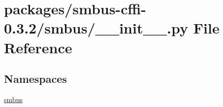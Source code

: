 \hypertarget{packages_2smbus-cffi-0_83_82_2smbus_2____init_____8py}{}\section{packages/smbus-\/cffi-\/0.3.2/smbus/\+\_\+\+\_\+init\+\_\+\+\_\+.py File Reference}
\label{packages_2smbus-cffi-0_83_82_2smbus_2____init_____8py}
\subsection*{Namespaces}
\begin{DoxyCompactItemize}
\item 
 \hyperlink{namespacesmbus}{smbus}
\end{DoxyCompactItemize}
